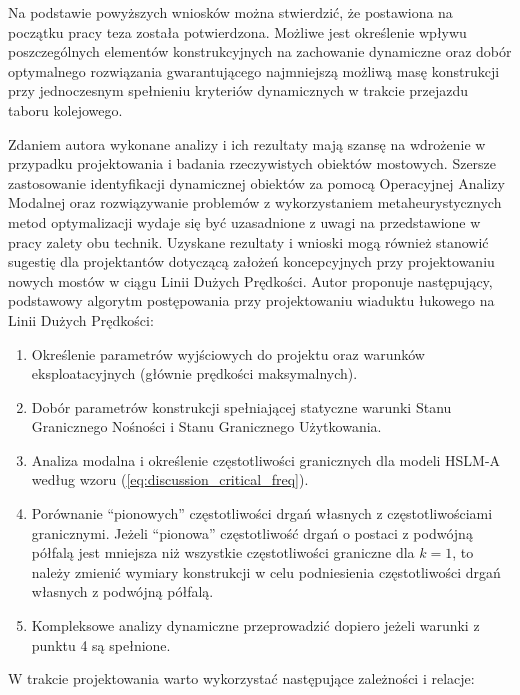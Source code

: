 Na podstawie powyższych wniosków można stwierdzić, że postawiona na początku pracy teza została potwierdzona. Możliwe jest określenie wpływu poszczególnych elementów konstrukcyjnych na zachowanie dynamiczne oraz dobór optymalnego rozwiązania gwarantującego najmniejszą możliwą masę konstrukcji przy jednoczesnym spełnieniu kryteriów dynamicznych w trakcie przejazdu taboru kolejowego.

Zdaniem autora wykonane analizy i ich rezultaty mają szansę na wdrożenie w przypadku projektowania i badania rzeczywistych obiektów mostowych. Szersze zastosowanie identyfikacji dynamicznej obiektów za pomocą Operacyjnej Analizy Modalnej oraz rozwiązywanie problemów z wykorzystaniem metaheurystycznych metod optymalizacji wydaje się być uzasadnione z uwagi na przedstawione w pracy zalety obu technik. Uzyskane rezultaty i wnioski mogą również stanowić sugestię dla projektantów dotyczącą założeń koncepcyjnych przy projektowaniu nowych mostów w ciągu Linii Dużych Prędkości. Autor proponuje następujący, podstawowy algorytm postępowania przy projektowaniu wiaduktu łukowego na Linii Dużych Prędkości:
\begin{enumerate}

\item Określenie parametrów wyjściowych do projektu oraz warunków eksploatacyjnych (głównie prędkości maksymalnych).

\item Dobór parametrów konstrukcji spełniającej statyczne warunki Stanu Granicznego Nośności i Stanu Granicznego Użytkowania.

\item Analiza modalna i określenie częstotliwości granicznych dla modeli HSLM-A według wzoru (\ref{eq:discussion_critical_freq}).

\item Porównanie \enquote{pionowych} częstotliwości drgań własnych z częstotliwościami granicznymi. Jeżeli \enquote{pionowa} częstotliwość drgań o postaci z podwójną półfalą jest mniejsza niż wszystkie częstotliwości graniczne dla $k=1$, to należy zmienić wymiary konstrukcji w celu podniesienia częstotliwości drgań własnych z podwójną półfalą.

\item Kompleksowe analizy dynamiczne przeprowadzić dopiero jeżeli warunki z punktu 4 są spełnione.

\end{enumerate}
\noindent
W trakcie projektowania warto wykorzystać następujące zależności i relacje:
